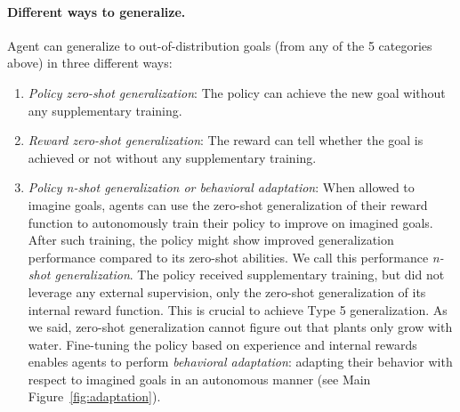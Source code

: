 \paragraph{Different ways to generalize.}
Agent can generalize to out-of-distribution goals (from any of the 5 categories above) in three different ways:
\begin{enumerate}
    \item \textit{Policy zero-shot generalization}: The policy can achieve the new goal without any supplementary training.
    \item \textit{Reward zero-shot generalization}: The reward can tell whether the goal is achieved or not without any supplementary training.
    \item \textit{Policy n-shot generalization or behavioral adaptation}:
    When allowed to imagine goals, \imagine agents can use the zero-shot generalization of their reward function to autonomously train their policy to improve on imagined goals. After such training, the policy might show improved generalization performance compared to its zero-shot abilities. We call this performance \textit{n-shot generalization}. The policy received supplementary training, but did not leverage any external supervision, only  the zero-shot generalization of its internal reward function. This is crucial to achieve Type 5 generalization. As we said, zero-shot generalization cannot figure out that plants only grow with water. Fine-tuning the policy based on experience and internal rewards enables agents to perform \textit{behavioral adaptation}: adapting their behavior with respect to imagined goals in an autonomous manner (see Main Figure~\ref{fig:adaptation}).
\end{enumerate}




